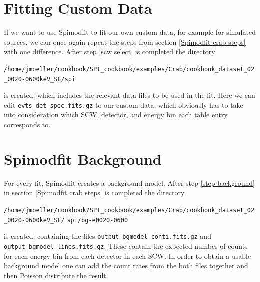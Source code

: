 \documentclass{report}
\begin{document}
\section{Fitting Custom Data}
If we want to use Spimodfit to fit our own custom data, for example for simulated sources, we can once again repeat the steps from section \ref{Spimodfit crab steps} with one difference. After step \ref{scw select} is completed the directory

\verb|/home/jmoeller/cookbook/SPI_cookbook/examples/Crab/cookbook_dataset_02_0020-0600keV_SE/spi|

is created, which includes the relevant data files to be used in the fit. Here we can edit \verb|evts_det_spec.fits.gz| to our custom data, which obviously has to take into consideration which SCW, detector, and energy bin each table entry corresponds to. 


\section{Spimodfit Background} \label{spimodfit bkg}
For every fit, Spimodfit creates a background model. After step \ref{step background} in section \ref{Spimodfit crab steps} is completed the directory

\verb|/home/jmoeller/cookbook/SPI_cookbook/examples/Crab/cookbook_dataset_02_0020-0600keV_SE/|\newline
\verb|spi/bg-e0020-0600|

is created, containing the files \verb|output_bgmodel-conti.fits.gz| and \verb|output_bgmodel-lines.fits.gz|. These contain the expected number of counts for each energy bin from each detector in each SCW. In order to obtain a usable background model one can add the count rates from the both files together and then Poisson distribute the result.

\nocite{*}
\printbibliography
\end{document}
